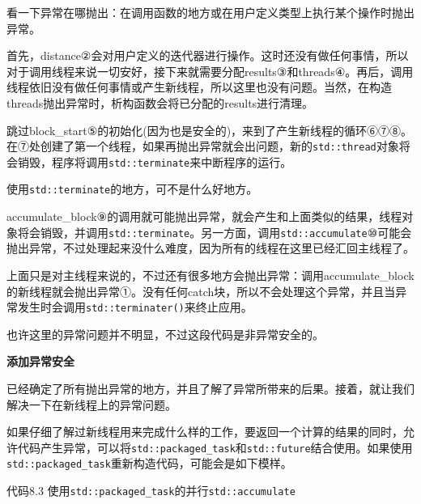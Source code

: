 看一下异常在哪抛出：在调用函数的地方或在用户定义类型上执行某个操作时抛出异常。

首先，distance②会对用户定义的迭代器进行操作。这时还没有做任何事情，所以对于调用线程来说一切安好，接下来就需要分配results③和threads④。再后，调用线程依旧没有做任何事情或产生新线程，所以这里也没有问题。当然，在构造threads抛出异常时，析构函数会将已分配的results进行清理。

跳过block\_start⑤的初始化(因为也是安全的)，来到了产生新线程的循环⑥⑦⑧。在⑦处创建了第一个线程，如果再抛出异常就会出问题，新的\texttt{std::thread}对象将会销毁，程序将调用\texttt{std::terminate}来中断程序的运行。

使用\texttt{std::terminate}的地方，可不是什么好地方。

accumulate\_block⑨的调用就可能抛出异常，就会产生和上面类似的结果，线程对象将会销毁，并调用\texttt{std::terminate}。另一方面，调用\texttt{std::accumulate}⑩可能会抛出异常，不过处理起来没什么难度，因为所有的线程在这里已经汇回主线程了。

上面只是对主线程来说的，不过还有很多地方会抛出异常：调用accumulate\_block的新线程就会抛出异常①。没有任何catch块，所以不会处理这个异常，并且当异常发生时会调用\texttt{std::terminater()}来终止应用。

也许这里的异常问题并不明显，不过这段代码是非异常安全的。

\textbf{添加异常安全}

已经确定了所有抛出异常的地方，并且了解了异常所带来的后果。接着，就让我们解决一下在新线程上的异常问题。

如果仔细了解过新线程用来完成什么样的工作，要返回一个计算的结果的同时，允许代码产生异常，可以将\texttt{std::packaged\_task}和\texttt{std::future}结合使用。如果使用\texttt{std::packaged\_task}重新构造代码，可能会是如下模样。

代码8.3 使用\texttt{std::packaged\_task}的并行\texttt{std::accumulate}

